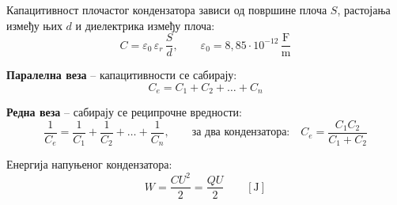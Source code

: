 \documentclass{article}
\begin{document}
Капацитивност плочастог кондензатора зависи од површине плоча $S$, растојања
између њих $d$ и диелектрика између плоча:
\[
C = \varepsilon_0 \, \varepsilon_r \, \frac{S}{d},
\qquad \varepsilon_0 = 8{,}85 \cdot 10^{-12}\,\frac{\text{F}}{\text{m}}
\]

\textbf{Паралелна веза} -- капацитивности се сабирају:
\[
C_e = C_1 + C_2 + \dots + C_n
\]

\textbf{Редна веза} -- сабирају се реципрочне вредности:
\[
\frac{1}{C_e} = \frac{1}{C_1} + \frac{1}{C_2} + \dots + \frac{1}{C_n},
\qquad \text{за два кондензатора:} \quad C_e = \frac{C_1 C_2}{C_1 + C_2}
\]

Енергија напуњеног кондензатора:
\[
W = \frac{C U^2}{2} = \frac{Q U}{2} \qquad [\text{J}]
\]

\end{document}
